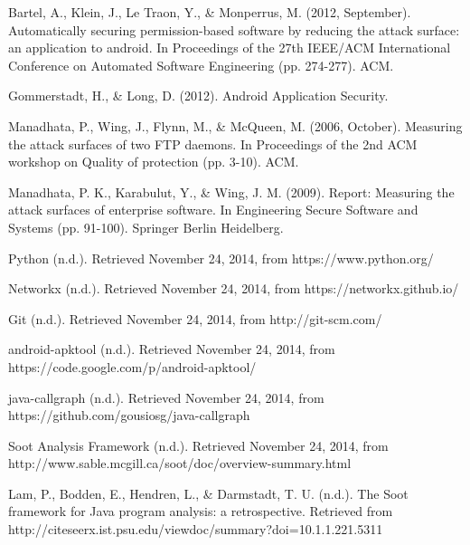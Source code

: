\documentclass[conference]{IEEEtran}
\begin{document}
\begin{thebibliography}{1}
Bartel, A., Klein, J., Le Traon, Y., \& Monperrus, M. (2012, September). Automatically securing permission-based software by reducing the attack surface: an application to android. In Proceedings of the 27th IEEE/ACM International Conference on Automated Software Engineering (pp. 274-277). ACM.

Gommerstadt, H., \& Long, D. (2012). Android Application Security. 

Manadhata, P., Wing, J., Flynn, M., \& McQueen, M. (2006, October). Measuring the attack surfaces of two FTP daemons. In Proceedings of the 2nd ACM workshop on Quality of protection (pp. 3-10). ACM. 

Manadhata, P. K., Karabulut, Y., \& Wing, J. M. (2009). Report: Measuring the attack surfaces of enterprise software. In Engineering Secure Software and Systems (pp. 91-100). Springer Berlin Heidelberg.

Python (n.d.). Retrieved November 24, 2014, from https://www.python.org/

Networkx (n.d.). Retrieved November 24, 2014, from https://networkx.github.io/

Git (n.d.). Retrieved November 24, 2014, from http://git-scm.com/

android-apktool (n.d.). Retrieved November 24, 2014, from https://code.google.com/p/android-apktool/

java-callgraph (n.d.). Retrieved November 24, 2014, from https://github.com/gousiosg/java-callgraph

Soot Analysis Framework (n.d.). Retrieved November 24, 2014, from http://www.sable.mcgill.ca/soot/doc/overview-summary.html

Lam, P., Bodden, E., Hendren, L., \& Darmstadt, T. U. (n.d.). The Soot framework for Java program analysis: a retrospective. Retrieved from http://citeseerx.ist.psu.edu/viewdoc/summary?doi=10.1.1.221.5311

\end{thebibliography}


\end{document}
